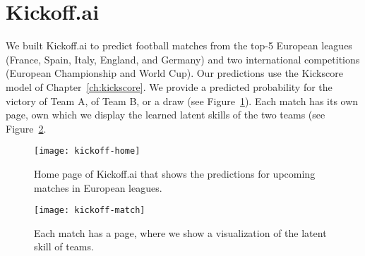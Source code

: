 \section{Kickoff.ai}
\label{app:kks:kickoffai}

We built Kickoff.ai to predict football matches from the top-5 European leagues (France, Spain, Italy, England, and Germany) and two international competitions (European Championship and World Cup).
Our predictions use the Kickscore model of Chapter~\ref{ch:kickscore}.
We provide a predicted probability for the victory of Team A, of Team B, or a draw (see Figure~\ref{app:fig:kickoff-home}).
Each match has its own page, own which we display the learned latent skills of the two teams (see Figure~\ref{app:fig:kickoff-match}.

\begin{figure}
	\centering
	\texttt{[image: kickoff-home]}
	\caption{Home page of Kickoff.ai that shows the predictions for upcoming matches in European leagues.}
	\label{app:fig:kickoff-home}
\end{figure}

\begin{figure}
	\centering
	\texttt{[image: kickoff-match]}
	\caption{Each match has a page, where we show a visualization of the latent skill of teams.}
	\label{app:fig:kickoff-match}
\end{figure}
